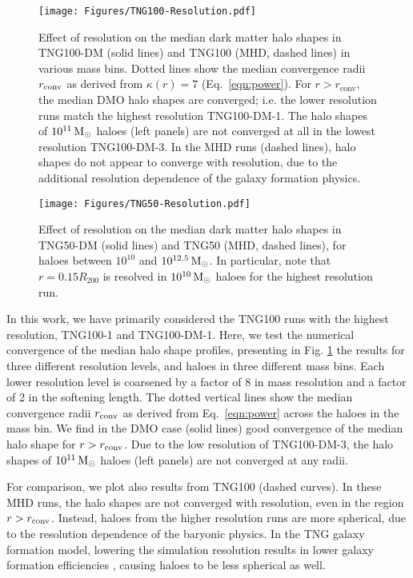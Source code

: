 \documentclass[fleqn,usenatbib]{mnras}
\def\msun{\,\rm M_{\odot}}
\begin{document}
\begin{figure*}
    \centering
    \texttt{[image: Figures/TNG100-Resolution.pdf]}
    \caption{Effect of resolution on the median dark matter halo shapes in TNG100-DM (solid lines) and TNG100 (MHD, dashed lines) in various mass bins.
    Dotted lines show the median convergence radii $r_{\rm conv}$ as derived from $\kappa(r) = 7$ (Eq.~\ref{eqn:power}).
    For $r > r_\text{conv}$, the median DMO halo shapes are converged; i.e. the lower resolution runs match the highest resolution TNG100-DM-1.
    The halo shapes of $10^{11}\msun$ haloes (left panels) are not converged at all in the lowest resolution TNG100-DM-3.
    In the MHD runs (dashed lines), halo shapes do not appear to converge with resolution, due to the additional resolution dependence of the galaxy formation physics.
    }
    \label{fig:resolution-tng100}
\end{figure*}

\begin{figure*}
    \centering
    \texttt{[image: Figures/TNG50-Resolution.pdf]}
    \caption{Effect of resolution on the median dark matter halo shapes in TNG50-DM (solid lines) and TNG50 (MHD, dashed lines), for haloes between $10^{10}$ and $10^{12.5} \msun$.
    In particular, note that $r=0.15 R_{200}$ is resolved in $10^{10} \msun$ haloes for the highest resolution run.
    }
    \label{fig:resolution-tng50}
\end{figure*}

In this work, we have primarily considered the TNG100 runs with the highest resolution, TNG100-1 and TNG100-DM-1.
Here, we test the numerical convergence of the median halo shape profiles, presenting in Fig. \ref{fig:resolution-tng100} the results for three different resolution levels, and haloes in three different mass bins.
Each lower resolution level is coarsened by a factor of 8 in mass resolution and a factor of 2 in the softening length.
The dotted vertical lines show the median convergence radii $r_{\rm conv}$ as derived from Eq.~\ref{eqn:power} across the haloes in the mass bin.
We find in the DMO case (solid lines) good convergence of the median halo shape for $r > r_{\rm conv}$.
Due to the low resolution of TNG100-DM-3, the halo shapes of $10^{11}\msun$ haloes (left panels) are not converged at any radii.

For comparison, we plot also results from TNG100 (dashed curves).
In these MHD runs, the halo shapes are not converged with resolution, even in the region  $r > r_{\rm conv}$.
Instead, haloes from the higher resolution runs are more spherical, due to the resolution dependence of the baryonic physics.
In the TNG galaxy formation model, lowering the  simulation resolution results in lower galaxy formation efficiencies \citep{Pillepich18v475}, causing haloes to be less spherical as well.
\end{document}
